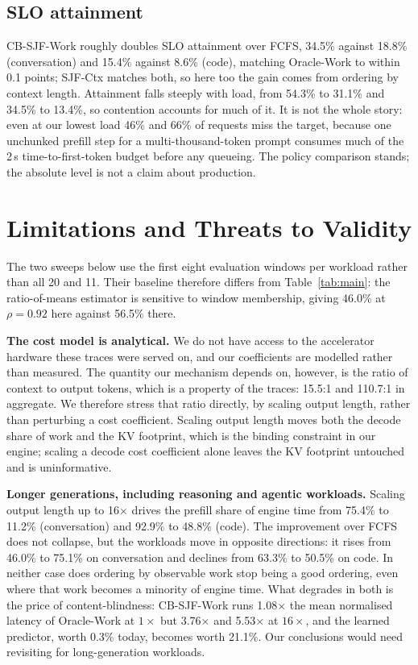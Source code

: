 \documentclass[conference,10pt,letterpaper]{IEEEtran}
\begin{document}
\subsection{SLO attainment}
CB-SJF-Work roughly doubles SLO attainment over FCFS, 34.5\% against 18.8\%
(conversation) and 15.4\% against 8.6\% (code), matching Oracle-Work to within
0.1 points; SJF-Ctx matches both, so here too the gain comes from ordering by
context length. Attainment falls steeply with load, from 54.3\% to 31.1\% and 34.5\% to 13.4\%,
so contention accounts for much of it. It is not the whole story: even at our
lowest load 46\% and 66\% of requests miss the target, because one unchunked
prefill step for a multi-thousand-token prompt consumes much of the 2\,s
time-to-first-token budget before any queueing. The policy comparison stands;
the absolute level is not a claim about production.

\section{Limitations and Threats to Validity}
\label{sec:limits}

The two sweeps below use the first eight evaluation windows per workload rather
than all 20 and 11. Their baseline therefore differs from
Table~\ref{tab:main}: the ratio-of-means estimator is sensitive to window
membership, giving 46.0\% at $\rho=0.92$ here against 56.5\% there.

\textbf{The cost model is analytical.} We do not have access to the accelerator
hardware these traces were served on, and our coefficients are modelled rather
than measured. The quantity our mechanism depends on, however, is the ratio of
context to output tokens, which is a property of the traces: 15.5:1 and 110.7:1
in aggregate. We therefore stress that ratio directly, by scaling output length,
rather than perturbing a cost coefficient. Scaling output length moves both the
decode share of work and the KV footprint, which is the binding constraint in
our engine; scaling a decode cost coefficient alone leaves the KV footprint
untouched and is uninformative.

\textbf{Longer generations, including reasoning and agentic workloads.} Scaling
output length up to 16$\times$ drives the prefill share of engine time from
75.4\% to 11.2\% (conversation) and 92.9\% to 48.8\% (code). The improvement
over FCFS does not collapse, but the workloads move in opposite directions: it
rises from 46.0\% to 75.1\% on conversation and declines from 63.3\% to 50.5\%
on code. In neither case does ordering by observable work stop being a good
ordering, even where that work becomes a minority of engine time. What degrades
in both is the price of content-blindness: CB-SJF-Work runs 1.08$\times$ the
mean normalised latency of Oracle-Work at $1\times$ but 3.76$\times$ and
5.53$\times$ at $16\times$, and the learned predictor, worth 0.3\% today,
becomes worth 21.1\%. Our conclusions would need revisiting for long-generation
workloads.
\end{document}
